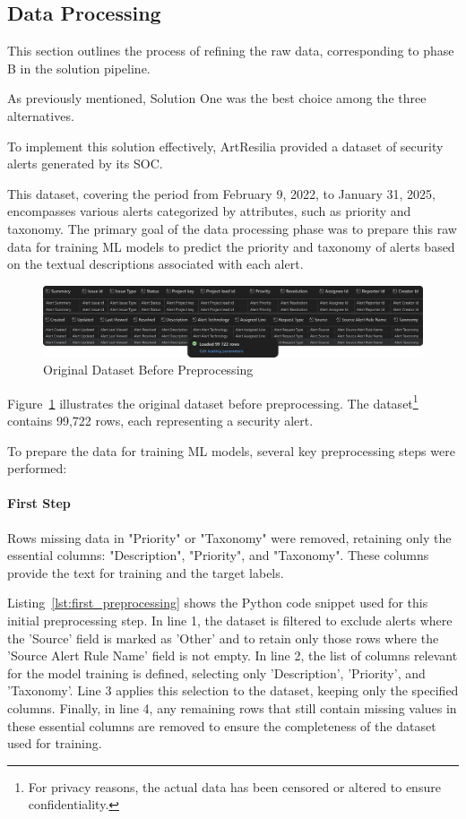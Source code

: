 \subsection{Data Processing}
This section outlines the process of refining the raw data, corresponding to phase B in the solution pipeline.

As previously mentioned, Solution One was the best choice among the three alternatives.

To implement this solution effectively, ArtResilia provided a dataset of security alerts generated by its SOC. 

This dataset, covering the period from February 9, 2022, to January 31, 2025, encompasses various alerts categorized by attributes, such as priority and taxonomy. 
The primary goal of the data processing phase was to prepare this raw data for training ML models to predict the priority and taxonomy of alerts based on the textual descriptions associated with each alert.

\begin{figure}[h!]
    \centering
    \includegraphics[width=\textwidth]{ch3/assets/dataset_original.png}
    \caption{Original Dataset Before Preprocessing}
    \label{fig:dataset_original}
\end{figure}

Figure~\ref{fig:dataset_original} illustrates the original dataset before preprocessing.
The dataset\footnote{For privacy reasons, the actual data has been censored or altered to ensure confidentiality.} contains 99,722 rows, each representing a security alert.

To prepare the data for training ML models, several key preprocessing steps were performed:

\paragraph{First Step}
Rows missing data in "Priority" or "Taxonomy" were removed, retaining only the essential columns: "Description", "Priority", and "Taxonomy". 
These columns provide the text for training and the target labels.

Listing~\ref{lst:first_preprocessing} shows the Python code snippet used for this initial preprocessing step. 
In line 1, the dataset is filtered to exclude alerts where the 'Source' field is marked as 'Other' and to retain only those rows where the 'Source Alert Rule Name' field is not empty. 
In line 2, the list of columns relevant for the model training is defined, selecting only 'Description', 'Priority', and 'Taxonomy'. 
Line 3 applies this selection to the dataset, keeping only the specified columns. 
Finally, in line 4, any remaining rows that still contain missing values in these essential columns are removed to ensure the completeness of the dataset used for training.

